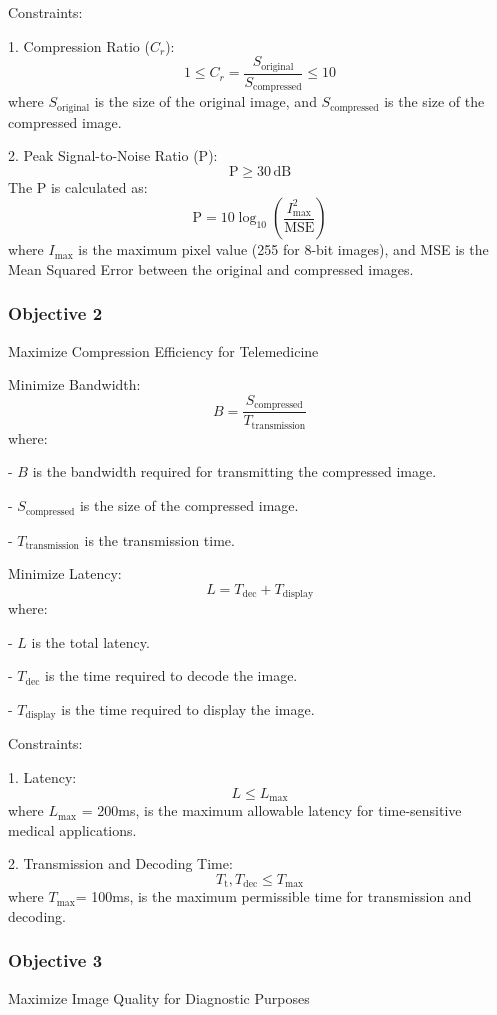 \documentclass[conference,letterpaper]{IEEEtran}
\begin{document}
Constraints:

1. Compression Ratio (\( C_r \)):
   \[
   1 \leq C_r = \frac{S_{\text{original}}}{S_{\text{compressed}}} \leq 10
   \]
   where \( S_{\text{original}} \) is the size of the original image, and \( S_{\text{compressed}} \) is the size of the compressed image.

2. Peak Signal-to-Noise Ratio (P):
   \[
   \text{P} \geq 30 \, \text{dB}
   \]
   The P is calculated as:
   \[
   \text{P} = 10 \log_{10} \left( \frac{I_{\text{max}}^2}{\text{MSE}} \right)
   \]
   where \(I_{\text{max}} \) is the maximum pixel value (255 for 8-bit images), and MSE is the Mean Squared Error between the original and compressed images.


 \subsubsection{Objective 2} Maximize Compression Efficiency for Telemedicine

Minimize Bandwidth:
\[
B = \frac{S_{\text{compressed}}}{T_{\text{transmission}}}
\]
where:

- \( B \) is the bandwidth required for transmitting the compressed image.

- \( S_{\text{compressed}} \) is the size of the compressed image.

- \( T_{\text{transmission}} \) is the transmission time.

Minimize Latency:
\[
L = T_{\text{dec}} + T_{\text{display}}
\]
where:

- \( L \) is the total latency.

- \( T_{\text{dec}} \) is the time required to decode the image.

- \( T_{\text{display}} \) is the time required to display the image.


Constraints:

1. Latency:
   \[
   L \leq L_{\text{max}}
   \]
   where \( L_{\text{max}} \) = 200ms, is the maximum allowable latency for time-sensitive medical applications.

2. Transmission and Decoding Time:
   \[
   T_{\text{t}}, T_{\text{dec}} \leq T_{\text{max}}
   \]
   where \( T_{\text{max}} \)= 100ms, is the maximum permissible time for transmission and decoding.


 \subsubsection{Objective 3} Maximize Image Quality for Diagnostic Purposes
\end{document}
